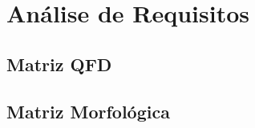 \section{Análise de Requisitos}
\label{sec:analise-de-requisitos}

\subsection{Matriz QFD}
\label{subsec:matriz-qfd}

\subsection{Matriz Morfológica}
\label{subsec:matriz-morfologica}
